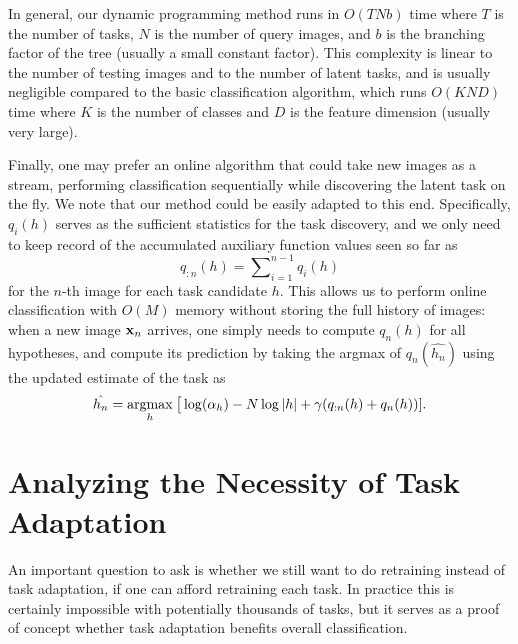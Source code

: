 In general, our dynamic programming method runs in $O(T\!Nb)$ time where $T$ is the number of tasks, $N$ is the number of query images, and $b$ is the branching factor of the tree (usually a small constant factor). This complexity is linear to the number of testing images and to the number of latent tasks, and is usually negligible compared to the basic classification algorithm, which runs $O(K\!N\!D)$ time where $K$ is the number of classes and $D$ is the feature dimension (usually very large).

Finally, one may prefer an online algorithm that could take new images as a stream, performing classification sequentially while discovering the latent task on the fly. We note that our method could be easily adapted to this end. Specifically, $q_i(h)$ serves as the sufficient statistics for the task discovery, and we only need to keep record of the accumulated auxiliary function values seen so far as 
\begin{equation}
    q_{:n}(h) = \sum\nolimits_{i=1}^{n-1} q_i(h)
\end{equation}
for the $n$-th image for each task candidate $h$. This allows us to perform online classification with $O(M)$ memory without storing the full history of images: when a new image $\mathbf{x}_n$ arrives, one simply needs to compute $q_n(h)$ for all hypotheses, and compute its prediction by taking the argmax of $q_n(\hat{h_n})$ using the updated estimate of the task as
\begin{eqnarray}
    \hat{h_n} = \underset{h}{\mathrm{argmax}} \: \big[\log(\alpha_h) - N\log|h| + \gamma(q_{:n}(h) + q_n(h))].
\end{eqnarray}

\section{Analyzing the Necessity of Task Adaptation}\label{sec:knowntask}
An important question to ask is whether we still want to do retraining instead of task adaptation, if one can afford retraining each task. In practice this is certainly impossible with potentially thousands of tasks, but it serves as a proof of concept whether task adaptation benefits overall classification.

